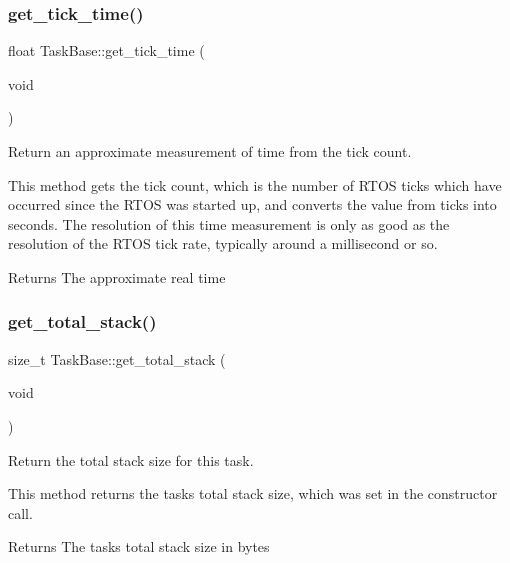 \subsubsection{\texorpdfstring{get\+\_\+tick\+\_\+time()}{get\_tick\_time()}}
{\footnotesize\ttfamily float Task\+Base\+::get\+\_\+tick\+\_\+time (\begin{DoxyParamCaption}\item[{void}]{ }\end{DoxyParamCaption})\hspace{0.3cm}{\ttfamily [inline]}}



Return an approximate measurement of time from the tick count. 

This method gets the tick count, which is the number of R\+T\+OS ticks which have occurred since the R\+T\+OS was started up, and converts the value from ticks into seconds. The resolution of this time measurement is only as good as the resolution of the R\+T\+OS tick rate, typically around a millisecond or so. \begin{DoxyReturn}{Returns}
The approximate real time 
\end{DoxyReturn}
\mbox{\label{class_task_base_aa3979e41ecb8f646f12d4283d87f93df}} 
\subsubsection{\texorpdfstring{get\+\_\+total\+\_\+stack()}{get\_total\_stack()}}
{\footnotesize\ttfamily size\+\_\+t Task\+Base\+::get\+\_\+total\+\_\+stack (\begin{DoxyParamCaption}\item[{void}]{ }\end{DoxyParamCaption})\hspace{0.3cm}{\ttfamily [inline]}}



Return the total stack size for this task. 

This method returns the task\textquotesingle{}s total stack size, which was set in the constructor call. \begin{DoxyReturn}{Returns}
The task\textquotesingle{}s total stack size in bytes 
\end{DoxyReturn}
\mbox{\label{class_task_base_a822796dba0ef4d457608363507d65f5a}} 
